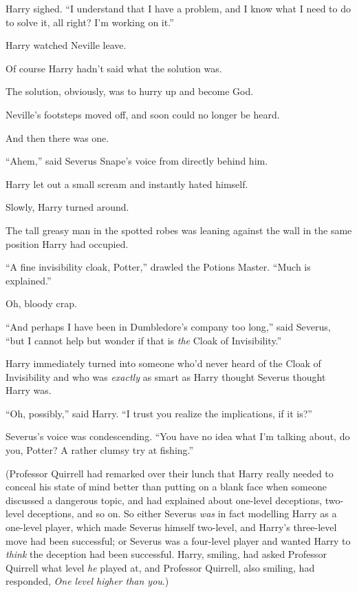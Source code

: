 Harry sighed. “I understand that I have a problem, and I know what I need to do to solve it, all right? I’m working on it.”

\later

Harry watched Neville leave.

Of course Harry hadn’t said what the solution was.

The solution, obviously, was to hurry up and become God.

Neville’s footsteps moved off, and soon could no longer be heard.

And then there was one.

“Ahem,” said Severus Snape’s voice from directly behind him.

Harry let out a small scream and instantly hated himself.

Slowly, Harry turned around.

The tall greasy man in the spotted robes was leaning against the wall in the same position Harry had occupied.

“A fine invisibility cloak, Potter,” drawled the Potions Master. “Much is explained.”

Oh, bloody crap.

“And perhaps I have been in Dumbledore’s company too long,” said Severus, “but I cannot help but wonder if that is \emph{the} Cloak of Invisibility.”

Harry immediately turned into someone who’d never heard of the Cloak of Invisibility and who was \emph{exactly} as smart as Harry thought Severus thought Harry was.

“Oh, possibly,” said Harry. “I trust you realize the implications, if it is?”

Severus’s voice was condescending. “You have no idea what I’m talking about, do you, Potter? A rather clumsy try at fishing.”

(Professor Quirrell had remarked over their lunch that Harry really needed to conceal his state of mind better than putting on a blank face when someone discussed a dangerous topic, and had explained about one-level deceptions, two-level deceptions, and so on. So either Severus \emph{was} in fact modelling Harry as a one-level player, which made Severus himself two-level, and Harry’s three-level move had been successful; or Severus was a four-level player and wanted Harry to \emph{think} the deception had been successful. Harry, smiling, had asked Professor Quirrell what level \emph{he} played at, and Professor Quirrell, also smiling, had responded, \emph{One level higher than you}.)

